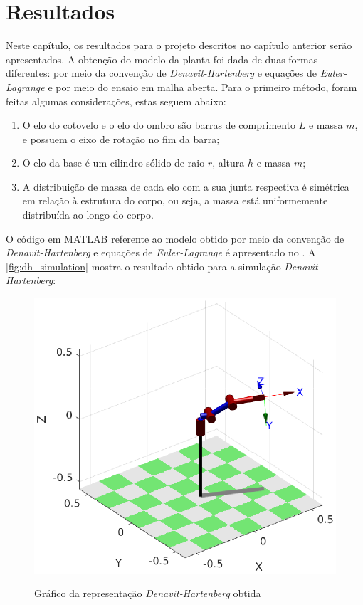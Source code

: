 \chapter{Resultados}

Neste capítulo, os resultados para o projeto descritos no capítulo anterior serão apresentados. A obtenção do modelo da 
planta foi dada de duas formas diferentes: por meio da convenção de \textit{Denavit-Hartenberg} e equações de 
\textit{Euler-Lagrange} e por meio do ensaio em malha aberta. Para o primeiro método, foram feitas algumas considerações,
estas seguem abaixo:

\begin{enumerate}
 \item O elo do cotovelo e o elo do ombro são barras de comprimento $L$ e massa $m$, e possuem o eixo de rotação no fim
 da barra;
 \item O elo da base é um cilindro sólido de raio $r$, altura $h$ e massa $m$;
 \item A distribuição de massa de cada elo com a sua junta respectiva é simétrica em relação à estrutura do corpo, ou seja,
 a massa está uniformemente distribuída ao longo do corpo.
\end{enumerate}

O código em MATLAB referente ao modelo obtido por meio da convenção de \textit{Denavit-Hartenberg} e equações de
\textit{Euler-Lagrange} é apresentado no . A \autoref{fig:dh_simulation} mostra 
o resultado obtido para a simulação \textit{Denavit-Hartenberg}:

\begin{figure}[ht]
  \centering
  \caption{Gráfico da representação \textit{Denavit-Hartenberg} obtida}
  \includegraphics[width = 0.78\columnwidth]{Imagens/dh_simulation}
  \label{fig:dh_simulation} 
\end{figure}

